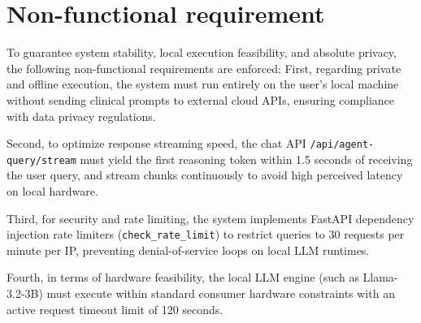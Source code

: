 \documentclass[../main.tex]{subfiles}
\begin{document}
\section{Non-functional requirement}
\label{section:2.4}
To guarantee system stability, local execution feasibility, and absolute privacy, the following non-functional requirements are enforced:
First, regarding private and offline execution, the system must run entirely on the user's local machine without sending clinical prompts to external cloud APIs, ensuring compliance with data privacy regulations. 

Second, to optimize response streaming speed, the chat API \texttt{/api/agent-query/stream} must yield the first reasoning token within 1.5 seconds of receiving the user query, and stream chunks continuously to avoid high perceived latency on local hardware. 

Third, for security and rate limiting, the system implements FastAPI dependency injection rate limiters (\texttt{check\_rate\_limit}) to restrict queries to 30 requests per minute per IP, preventing denial-of-service loops on local LLM runtimes. 

Fourth, in terms of hardware feasibility, the local LLM engine (such as Llama-3.2-3B) must execute within standard consumer hardware constraints with an active request timeout limit of 120 seconds.
\end{document}
